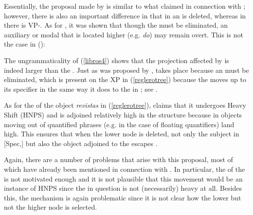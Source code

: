 Essentially, the proposal made by \citet{reglero2006} is similar to what \citet{kennedymerchant2000} claimed in connection with ; however, there is also an important difference in that in  an  is deleted, whereas in  there is VP-. As for , it was shown that though the  must be eliminated, an auxiliary or modal that is located higher (e.g. \textit{do}) may remain overt. This is not the case in  (\citealt[73, ex. 25]{reglero2006}):

\z

The ungrammaticality of (\ref{libros4}) shows that the projection affected by  is indeed larger than the . Just as was proposed by \citet{kennedymerchant2000},  takes place because an  must be eliminated, which is present on the XP in (\ref{reglerotree}) because the  moves up to its specifier in the same way it does to the  in \citet{kennedymerchant2000}; see \citet[73--74]{reglero2006}.

As for the  of the object  \textit{revistas} in (\ref{reglerotree}), \citet[75--77]{reglero2006} claims that it undergoes Heavy  Shift (HNPS) and is adjoined relatively high in the structure because in  objects moving out of quantified phrases (e.g. in the case of floating quantifiers) land high. This ensures that when the lower  node is deleted, not only the subject in [Spec,] but also the object adjoined to the  escapes .

Again, there are a number of problems that arise with this proposal, most of which have already been mentioned in connection with \citet{kennedymerchant2000}. In particular, the  of the  is not motivated enough and it is not plausible that this movement would be an instance of HNPS since the  in question is not (necessarily) heavy at all. Besides this, the  mechanism is again problematic since it is not clear how the lower but not the higher  node is selected.

